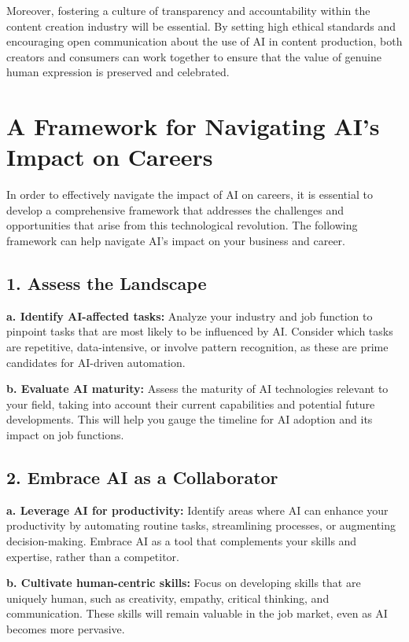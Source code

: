 Moreover, fostering a culture of transparency and accountability within the content creation industry will be essential. By setting high ethical standards and encouraging open communication about the use of AI in content production, both creators and consumers can work together to ensure that the value of genuine human expression is preserved and celebrated.

\section{A Framework for Navigating AI's Impact on Careers}

In order to effectively navigate the impact of AI on careers, it is essential to develop a comprehensive framework that addresses the challenges and opportunities that arise from this technological revolution. The following framework can help navigate AI's impact on your business and career.

\subsection{1. Assess the Landscape}

\textbf{a. Identify AI-affected tasks:} Analyze your industry and job function to pinpoint tasks that are most likely to be influenced by AI. Consider which tasks are repetitive, data-intensive, or involve pattern recognition, as these are prime candidates for AI-driven automation.

\textbf{b. Evaluate AI maturity:} Assess the maturity of AI technologies relevant to your field, taking into account their current capabilities and potential future developments. This will help you gauge the timeline for AI adoption and its impact on job functions.

\subsection{2. Embrace AI as a Collaborator}

\textbf{a. Leverage AI for productivity:} Identify areas where AI can enhance your productivity by automating routine tasks, streamlining processes, or augmenting decision-making. Embrace AI as a tool that complements your skills and expertise, rather than a competitor.

\textbf{b. Cultivate human-centric skills:} Focus on developing skills that are uniquely human, such as creativity, empathy, critical thinking, and communication. These skills will remain valuable in the job market, even as AI becomes more pervasive.

